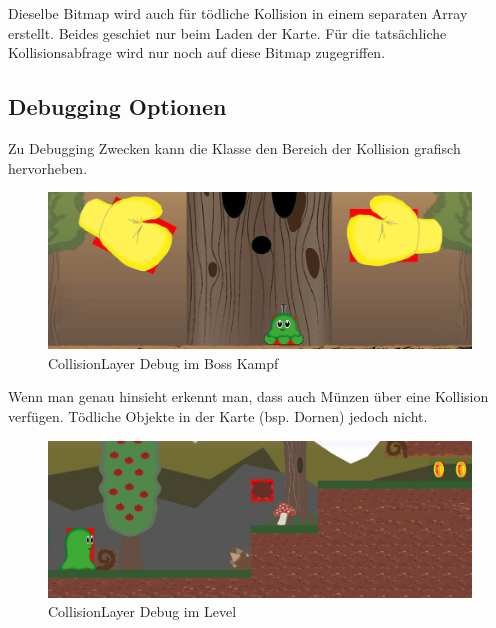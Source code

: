 Dieselbe Bitmap wird auch für tödliche Kollision in einem separaten Array erstellt. Beides geschiet nur beim Laden der Karte. Für die tatsächliche Kollisionsabfrage wird nur noch auf diese Bitmap zugegriffen.



\label{sec:4_CollisionLayer}
\subsection{Debugging Optionen}\label{sec:CollisionLayerDebug}

Zu Debugging Zwecken kann die  Klasse den Bereich der Kollision grafisch hervorheben.

\begin{figure}[H]
  \centering
  \includegraphics[width=\textwidth - 50pt]{resources/CollisionLayer_BossKampf.jpg}
  \caption{CollisionLayer Debug im Boss Kampf}
  \label{fig:collision_debug_boss} 
\end{figure}

Wenn man genau hinsieht erkennt man, dass auch Münzen über eine Kollision verfügen. Tödliche Objekte in der Karte (bsp. Dornen) jedoch nicht.

\begin{figure}[H]
  \centering
  \includegraphics[width=\textwidth - 50pt]{resources/CollisionLayer_Level}
  \caption{CollisionLayer Debug im Level}
  \label{fig:collision_debug_level} 
\end{figure}



